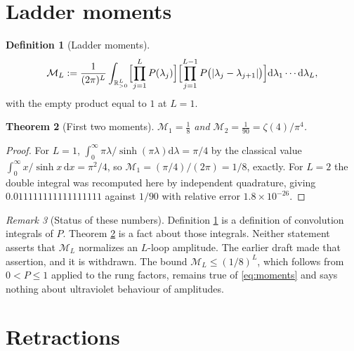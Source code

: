 \documentclass[12pt,a4paper]{article}
\theoremstyle{plain}
\newtheorem{theorem}{Theorem}[section]
\theoremstyle{definition}
\newtheorem{definition}[theorem]{Definition}
\theoremstyle{remark}
\newtheorem{remark}[theorem]{Remark}
\newcommand{\R}{\mathbb{R}}
\newcommand{\dd}{\mathrm{d}}
\newcommand{\cM}{\mathcal{M}}
\begin{document}
\section{Ladder moments}

\begin{definition}[Ladder moments]
\label{def:moments}
\begin{equation}
\cM_L:=\frac{1}{(2\pi)^L}\int_{\R_{>0}^L}
\Bigl[\prod_{j=1}^{L}P(\lambda_j)\Bigr]
\Bigl[\prod_{j=1}^{L-1}P\bigl(|\lambda_j-\lambda_{j+1}|\bigr)\Bigr]
\dd\lambda_1\cdots\dd\lambda_L ,
\label{eq:moments}
\end{equation}
with the empty product equal to $1$ at $L=1$.
\end{definition}

\begin{theorem}[First two moments]
\label{thm:moments}
$\cM_1=\tfrac18$ and $\cM_2=\tfrac{1}{90}=\zeta(4)/\pi^4$.
\end{theorem}

\begin{proof}
For $L=1$, $\int_0^\infty \pi\lambda/\sinh(\pi\lambda)\dd\lambda=\pi/4$
by the classical value $\int_0^\infty x/\sinh x\,\dd x=\pi^2/4$, so
$\cM_1=(\pi/4)/(2\pi)=1/8$, exactly. For $L=2$ the double integral was
recomputed here by independent quadrature, giving
$0.011111111111111111$ against $1/90$ with relative error
$1.8\times10^{-26}$.
\end{proof}

\begin{remark}[Status of these numbers]
Definition \ref{def:moments} is a definition of convolution integrals
of $P$. Theorem \ref{thm:moments} is a fact about those integrals.
Neither statement asserts that $\cM_L$ normalizes an $L$-loop
amplitude. The earlier draft made that assertion, and it is withdrawn.
The bound $\cM_L\le(1/8)^L$, which follows from
$0<P\le1$ applied to the rung factors, remains true of
\eqref{eq:moments} and says nothing about ultraviolet behaviour of
amplitudes.
\end{remark}

\section{Retractions}
\label{sec:retractions}
\end{document}
